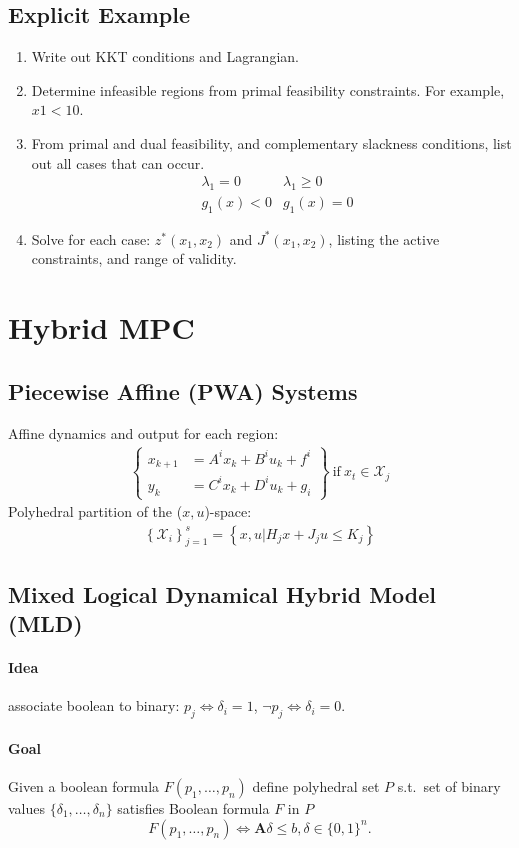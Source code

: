 \documentclass[landscape,a4paper,8pt]{scrartcl}
\renewcommand{\iff}{\Leftrightarrow}
\newcommand{\mc}[1]{\mathcal{#1}}
\newcommand\vA{\bm{A}}
\newcommand{\Mg}[1]{\begin{Bmatrix}#1\end{Bmatrix}} %
\begin{document}
\begin{multicols*}{3}
\subsection{Explicit Example}
\begin{enumerate}
 \itemsep0em
 \item Write out KKT conditions and Lagrangian.
 \item Determine infeasible regions from primal feasibility constraints. For example, $x1 < 10$.
 \item From primal and dual feasibility, and complementary slackness conditions, list out all cases that can occur.
 \begin{align*}
  &\lambda_1 = 0 &\lambda_1 \geq 0\\
  & g_1(x) < 0 &g_1(x) = 0
 \end{align*}
 \item Solve for each case: $z^*(x_1, x_2)$ and $J^*(x_1, x_2)$, listing the active constraints, and range of validity.
\end{enumerate}

\section{Hybrid MPC}
\subsection{Piecewise Affine (PWA) Systems}
Affine dynamics and output for each region:
\begin{align*}
\Mg{x_{k+1} &= A^i x_k + B^i u_k + f^i \\ y_k &= C^i x_k + D^i u_k + g_i} \mathrm{~if~} x_t \in \mc{X}_j
\end{align*}
Polyhedral partition of the ($x,u$)-space:
\begin{align*}
\left\{\mc{X}_i\right\}_{j=1}^s = \left\{x,u| H_j x + J_j u \leq K_j\right\}
\end{align*}

\subsection{Mixed Logical Dynamical Hybrid Model (MLD)}
\paragraph{Idea}
associate boolean to binary: $ p_j \iff \delta_i = 1$, $\neg p_j \iff \delta_i =0$.
\paragraph{Goal}
Given a boolean formula $F(p_1, \dots, p_n)$ define polyhedral set $P$ s.t.\ set of binary values $\{\delta_1,\dots,\delta_n\}$ satisfies Boolean formula $F$ in $P$
\[ F(p_1, \dots, p_n) \iff \vA\delta \leq b, \delta \in \{0,1\}^n. \]


\end{multicols*}
\end{document}
